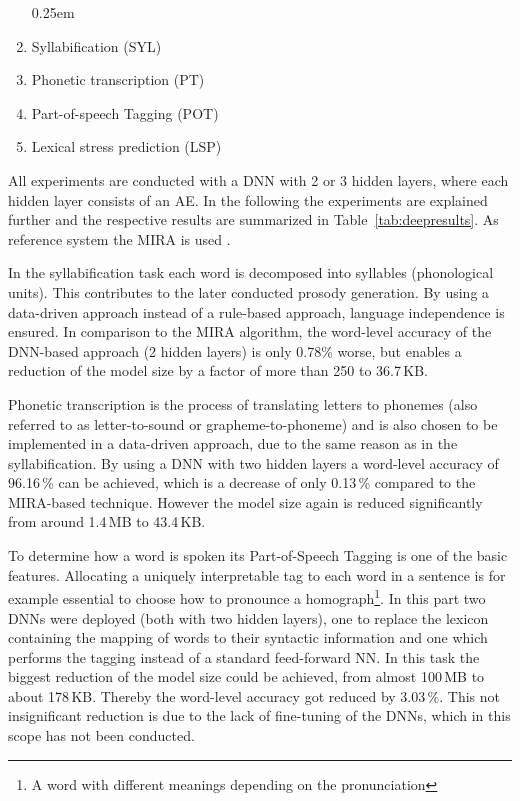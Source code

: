\begin{enumerate}[label=\arabic*.]		%
	\parskip0.25em
	\bfseries
	\item Syllabification (SYL)
	\item Phonetic transcription (PT)
	\item Part-of-speech Tagging (POT)
	\item Lexical stress prediction (LSP)
\end{enumerate}

All experiments are conducted with a \ac{DNN} with 2 or 3 hidden layers, where each hidden layer consists of an \acf{AE}.
In the following the experiments are explained further and the respective results are summarized in Table~\ref{tab:deepresults}. As reference system the \ac{MIRA} is used \cite{boros:mira}.

In the syllabification task each word is decomposed into syllables (phonological units). This contributes to the later conducted prosody generation. By using a data-driven approach instead of a rule-based approach, language independence is ensured. In comparison to the \ac{MIRA} algorithm, the word-level accuracy of the \ac{DNN}-based approach (2 hidden layers) is only 0.78\% worse, but enables a reduction of the model size by a factor of more than 250 to 36.7\,KB.

Phonetic transcription is the process of translating letters to phonemes (also referred to as letter-to-sound or grapheme-to-\break phoneme) and is also chosen to be implemented in a data-driven approach, due to the same reason as in the syllabification. By using a \ac{DNN} with two hidden layers a word-level accuracy of 96.16\,\% can be achieved, which is a decrease of only 0.13\,\% compared to the \ac{MIRA}-based technique. However the model size again is reduced significantly from around 1.4\,MB to 43.4\,KB.

To determine how a word is spoken its Part-of-Speech Tagging is one of the basic features. Allocating a uniquely interpretable tag to each word in a sentence is for example essential to choose how to pronounce a homograph\footnote{A word with different meanings depending on the pronunciation}. In this part two \acp{DNN} were deployed (both with two hidden layers), one to replace the lexicon containing the mapping of words to their syntactic information and one which performs the tagging instead of a standard feed-forward \ac{NN}. In this task the biggest reduction of the model size could be achieved, from almost 100\,MB to about 178\,KB. Thereby the word-level accuracy got reduced by 3.03\,\%. This not insignificant reduction is due to the lack of fine-tuning of the \acp{DNN}, which in this scope has not been conducted.

